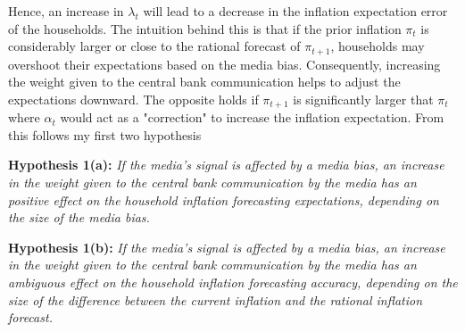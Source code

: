 \documentclass[review]{elsarticle}
\begin{document}
Hence, an increase in $\lambda_t$ will lead to a decrease in the inflation expectation error of the households. The intuition behind this is that if the prior inflation $\pi_t$ is considerably larger or close to the rational forecast of $\pi_{t+1}$, households may overshoot their expectations based on the media bias. Consequently, increasing the weight given to the central bank communication helps to adjust the expectations downward. The opposite holds if $\pi_{t+1}$ is significantly larger that $\pi_t$ where $\alpha_t$ would act as a "correction" to increase the inflation expectation. From this follows my first two hypothesis
\\
\par
\textbf{Hypothesis 1(a):} \textit{If the media's signal is affected by a media bias, an increase in the weight given to the central bank communication by the media has an positive effect on the household inflation forecasting expectations, depending on the size of the media bias.\\} 
\par
\par
\textbf{Hypothesis 1(b):} \textit{If the media's signal is affected by a media bias, an increase in the weight given to the central bank communication by the media has an ambiguous effect on the household inflation forecasting accuracy, depending on the size of the difference between the current inflation and the rational inflation forecast.\\} 
\par
\end{document}
